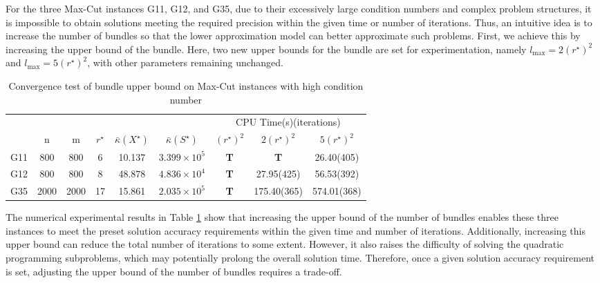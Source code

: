 \documentclass{jcmlatex}
\begin{document}
For the three Max-Cut instances G11, G12, and G35, due to their excessively large condition numbers and complex problem structures, it is impossible to obtain solutions meeting the required precision within the given time or number of iterations. Thus, an intuitive idea is to increase the number of bundles so that the lower approximation model can better approximate such problems. First, we achieve this by increasing the upper bound of the bundle. Here, two new upper bounds for the bundle are set for experimentation, namely \(l_{\max}=2(r^{\star})^{2}\) and \(l_{\max}=5(r^{\star})^{2}\), with other parameters remaining unchanged.
\begin{table}
    \centering
    \caption{Convergence test of bundle upper bound on Max-Cut instances with high condition number}
    \label{t9}
    \setlength\tabcolsep{0.9pt}
    \begin{tabular*}{\textwidth}{@{\extracolsep\fill}ccccccccc}
\toprule  
~&~&~&~&~&~& \multicolumn{3}{c}{CPU Time(s)(iterations)} \\
\cmidrule{7-9}
 & n &m& \(r^{\star}\) &\(\bar{\kappa}(X^{\star})\)&\(\bar{\kappa}(S^{\star})\)& \((r^{\star})^{2}\) & \(2(r^{\star})^{2}\)&\(5(r^{\star})^{2}\)\\ 
\midrule 
    G11 & 800&800 &6&10.137 &\(3.399\times 10^5\)  &\textbf{T} &\textbf{T} &26.40(405)\\
    G12 & 800&800 &8&48.878 &\(4.836\times 10^4\)  &\textbf{T} &27.95(425) &56.53(392)  \\
    G35 & 2000&2000 &17&15.861 &\(2.035\times 10^5\) &\textbf{T} &175.40(365) &574.01(368)  \\
\hline
\end{tabular*}
\end{table}

The numerical experimental results in Table \ref{t9} show that increasing the upper bound of the number of bundles enables these three instances to meet the preset solution accuracy requirements within the given time and number of iterations. Additionally, increasing this upper bound can reduce the total number of iterations to some extent. However, it also raises the difficulty of solving the quadratic programming subproblems, which may potentially prolong the overall solution time. Therefore, once a given solution accuracy requirement is set, adjusting the upper bound of the number of bundles requires a trade-off.
\end{document}
